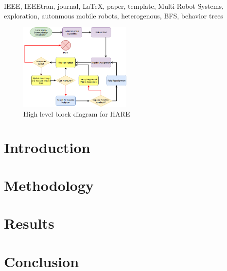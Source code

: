 \documentclass[conference]{IEEEtran}
\begin{document}
\begin{IEEEkeywords}
IEEE, IEEEtran, journal, \LaTeX, paper, template, Multi-Robot Systems, exploration, autonmous mobile robots, heterogenous, BFS, behavior trees
\end{IEEEkeywords}


\IEEEpeerreviewmaketitle

\begin{figure}[H]
  \centering
    \includegraphics[width=0.5\textwidth]{hare}
  \caption{High level block diagram for HARE}
  \label{fig:something3}
\end{figure}

\section{Introduction}


\section{Methodology}

\section{Results}

\section{Conclusion}
\end{document}
